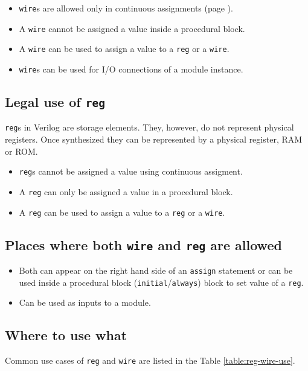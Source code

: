 \documentclass[a4paper,10pt]{article}
\theoremstyle{mytheor}
\newcommand{\inlinev}[1]{\lstinline[style=verilog-inline-style]{#1}}
\begin{document}
\begin{itemize}
\item \inlinev{wire}s are allowed only
  in continuous assignments (page \pageref{continuous-assignment}).
\item A \inlinev{wire} cannot be
  assigned a value inside a procedural block.
\item A \inlinev{wire} can be used to
  assign a value to a \inlinev{reg} or a
  \inlinev{wire}.
\item \inlinev{wire}s can be used for I/O connections of a module instance.
\end{itemize}

\subsection{Legal use of \inlinev{reg}}
\inlinev{reg}s in Verilog are storage
elements. They, however, do not represent physical registers. Once
synthesized they can be represented by a physical register, RAM or
ROM.

 \begin{itemize}
 \item \inlinev{reg}s cannot be assigned
   a value using continuous assigment.
 \item A \inlinev{reg} can only be
   assigned a value in a procedural block.
 \item A \inlinev{reg} can be used to
   assign a value to a \inlinev{reg} or
   a \inlinev{wire}.
\end{itemize}

 \subsection{Places where both \inlinev{wire} and \inlinev{reg} are allowed}

 \begin{itemize}
 \item Both can appear on the right hand side of an
   \inlinev{assign} statement or can be
   used inside a procedural block
   (\inlinev{initial}/\inlinev{always})
   block to set value of a
   \inlinev{reg}.
 \item Can be used as inputs to a module.
\end{itemize}


\subsection{Where to use what}
Common use cases of \inlinev{reg} and \inlinev{wire} are listed in
the Table \ref{table:reg-wire-use}.
\end{document}
